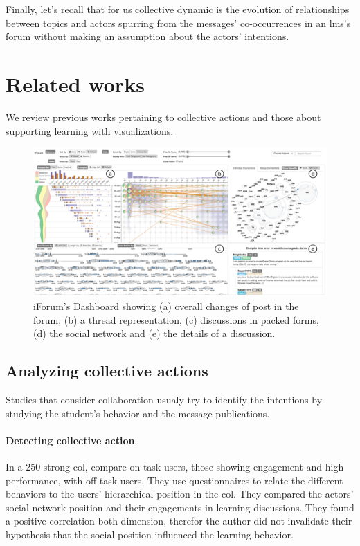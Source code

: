 \documentclass[a4paper,twoside]{article}
\begin{document}

Finally, let's recall that for us collective dynamic is the evolution of relationships between topics and actors spurring from the messages' co-occurrences in an \gls{lms}'s forum without making an assumption about the actors' intentions.

\section{Related works}
\label{section:3}
We review previous works pertaining to collective actions and those about supporting learning with visualizations.


\begin{figure}[b]
  \small{
    \caption{\label{fig:fu}
      iForum's Dashboard \citep{Fu2017} showing (a) overall changes of post in the forum, (b) a thread representation, (c) discussions in packed forms, (d) the social network and (e) the details of a discussion.
    }}
  \centering
  \includegraphics[width=.5\textwidth]{images/fu.png}
\end{figure}


\subsection{Analyzing collective actions}
Studies that consider collaboration usualy try to identify the intentions by studying the student's behavior and the message publications.


\paragraph{Detecting collective action}  In a 250 strong \gls{col}, \cite{Rehm2015} compare on-task users, those showing engagement and high performance, with off-task users.  They use questionnaires to relate the different behaviors to the users' hierarchical position in the \gls{col}.  They compared the actors' social network position and their engagements in learning discussions.  They found a positive correlation both dimension, therefor the author did not invalidate their hypothesis that the social position influenced the learning behavior. %
\end{document}
